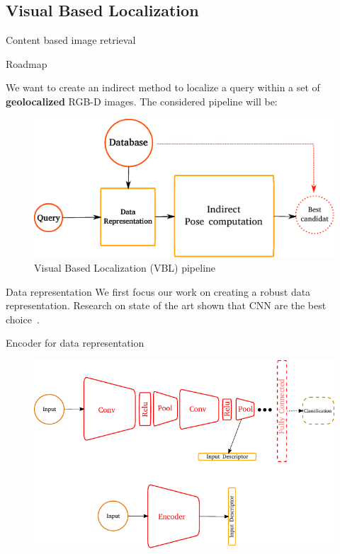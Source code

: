 \subsection{Visual Based Localization}

\label{sec:intro}

\begin{frame}{Content based image retrieval}

\end{frame}

\begin{frame}{Roadmap}

	We want to create an indirect method to localize a query within a set of \textbf{geolocalized} RGB-D images. The considered pipeline will be:
	
	\begin{figure}
		\includegraphics{vect/keys_comp_indirect.pdf}		
		\caption{Visual Based Localization (VBL) pipeline}
	\end{figure}		
		
\end{frame}

\begin{frame}{Data representation}
	We first focus our work on creating a robust data representation. Research on state of the art shown that CNN are the best choice~\cite{Arandjelovic2017}.
	
	\begin{block}{Encoder for data representation}
		\begin{figure}[c]
			\includegraphics[width=0.75\linewidth]{vect/encodeur.pdf}					
		\end{figure}
	\end{block}
	
\end{frame}

